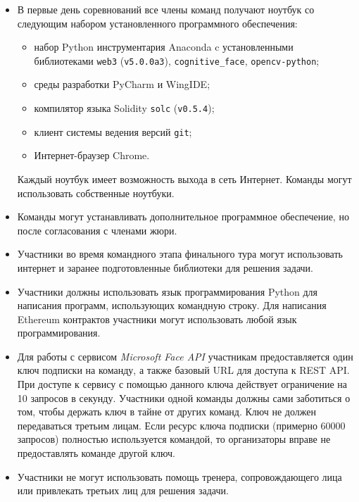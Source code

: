 \begin{itemize}
    \item В первые день соревнований все члены команд получают ноутбук со следующим набором
    установленного программного обеспечения:
    \begin{itemize}
        \item набор Python инструментария Anaconda c установленными библиотеками \texttt{web3} (\texttt{v5.0.0a3}), \texttt{cognitive\_face}, \texttt{opencv-python};
        \item среды разработки PyCharm и WingIDE;
        \item компилятор языка Solidity \texttt{solc} (\texttt{v0.5.4});
        \item клиент системы ведения версий \texttt{git};
        \item Интернет-браузер Chrome.
    \end{itemize}
    Каждый ноутбук имеет возможность выхода в сеть Интернет. Команды могут использовать
    собственные ноутбуки.

    \item Команды могут устанавливать дополнительное программное обеспечение, но после
    согласования с членами жюри.

    \item Участники во время командного этапа финального тура могут использовать интернет
    и заранее подготовленные библиотеки для решения задачи.

    \item Участники должны использовать язык программирования Python для написания
    программ, использующих командную строку. Для написания Ethereum контрактов
    участники могут использовать любой язык программирования.

    \item Для работы с сервисом \textit{Microsoft Face API} участникам предоставляется
    один ключ подписки на команду, а также базовый URL для доступа к REST API. При
    доступе к сервису с помощью данного ключа действует ограничение на 10 запросов в
    секунду. Участники одной команды должны сами заботиться о том, чтобы держать ключ
    в тайне от других команд. Ключ не должен передаваться третьим лицам. Если ресурс
    ключа подписки (примерно 60000 запросов) полностью используется командой, то
    организаторы вправе не предоставлять команде другой ключ.

    \item Участники не могут использовать помощь тренера, сопровождающего лица или
    привлекать третьих лиц для решения задачи.


\end{itemize}
